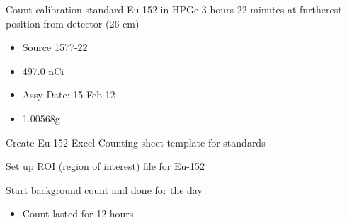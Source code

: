 \documentclass[idxtotoc,hyperref,openany,oneside]{labbook} %
\newcommand{\cmark}{\ding{51}}%
\newcommand{\done}{\rlap{$\square$}{\raisebox{2pt}{\large\hspace{1pt}\cmark}}%
  \hspace{-2.5pt}}
\begin{document}
\begin{todolist}
\item[\done]{Count calibration standard Eu-152 in HPGe 3 hours 22 minutes at furtherest position from detector (26 cm)}
  \begin{itemize}
  \item{Source 1577-22}
  \item{497.0 nCi}
  \item{Assy Date: 15 Feb 12}
  \item{1.00568g}
  \end{itemize}
\item[\done]{Create Eu-152 Excel Counting sheet template for standards}
\item[\done]{Set up ROI (region of interest) file for Eu-152}
\item[\done]{Start background count and done for the day}
  \begin{itemize}
  \item{Count lasted for 12 hours}
  \end{itemize}
\end{todolist}



\end{document}
